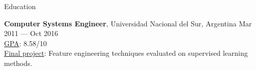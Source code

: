 \documentclass{resume} %
\begin{document}
\begin{rSection}{Education}
\item {\bf \large Computer Systems Engineer}, Universidad Nacional del Sur, Argentina \hfill {Mar 2011 --- Oct 2016}\\
\underline{GPA}: 8.58/10\\
\underline{Final project}: Feature engineering techniques evaluated on supervised learning methods.\\

\end{rSection}
\vspace{-0.2cm}
\end{document}
